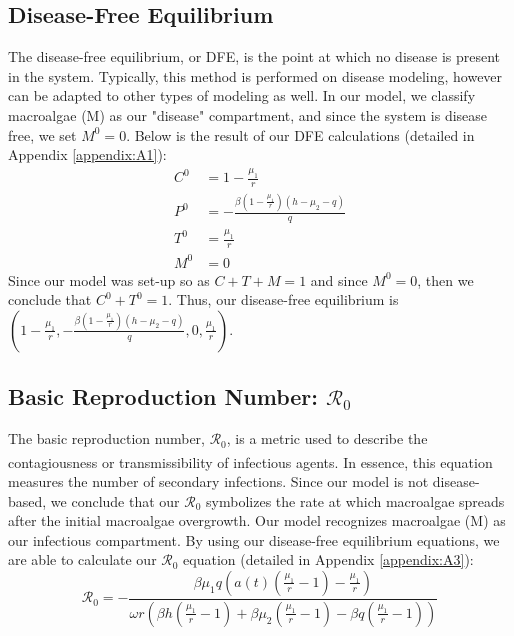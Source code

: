 \documentclass[12pt]{article}
\begin{document}
\subsection{Disease-Free Equilibrium}
The disease-free equilibrium, or DFE, is the point at which no disease is present in the system. Typically, this method is performed on disease modeling, however can be adapted to other types of modeling as well. In our model, we classify macroalgae (M) as our "disease" compartment, and since the system is disease free, we set $M^{0} = 0$. Below is the result of our DFE calculations (detailed in Appendix \ref{appendix:A1}):
\begin{align*}
        C^{0} &= 1 - \frac{\mu_{1}}{r} \label{eq:C0}\\
        P^{0} &= -\frac{\beta(1 - \frac{\mu_{1}}{r})(h - \mu_{2} - q)}{q} \label{eq:P0}\\
        T^{0} &= \frac{\mu_{1}}{r} \label{eq:T0}\\
        M^{0} &= 0 \label{eq:M0}
\end{align*}
Since our model was set-up so as $C+T+M=1$ and since $M^{0} = 0$, then we conclude that $C^{0} + T^{0} = 1$. Thus, our disease-free equilibrium is $(1 - \frac{\mu_{1}}{r}, -\frac{\beta(1 - \frac{\mu_{1}}{r})(h - \mu_{2} - q)}{q}, 0, \frac{\mu_{1}}{r})$.

\subsection{Basic Reproduction Number: $\mathscr{R}_{0}$}
The basic reproduction number, $\mathscr{R}_{0}$, is a metric used to describe the contagiousness or transmissibility of infectious agents\textsuperscript{\cite{delamater_street_leslie_yang_jacobsen_2019}}. In essence, this equation measures the number of secondary infections. Since our model is not disease-based, we conclude that our $\mathscr{R}_{0}$ symbolizes the rate at which macroalgae spreads after the initial macroalgae overgrowth. Our model recognizes macroalgae (M) as our infectious compartment. By using our disease-free equilibrium equations, we are able to calculate our $\mathscr{R}_{0}$ equation (detailed in Appendix \ref{appendix:A3}): 
\begin{equation*}\label{eq:R0}
    \displaystyle {\mathscr{R}}_{0} = - \frac{\beta \mu_{1}q(a(t)(\frac{\mu_{1}}{r}-1)-\frac{\mu_{1}}{r})}{\omega r (\beta h (\frac{\mu_{1}}{r}-1) + \beta \mu_{2} (\frac{\mu_{1}}{r}-1) - \beta q(\frac{\mu_{1}}{r}-1))}
\end{equation*}
\end{document}
